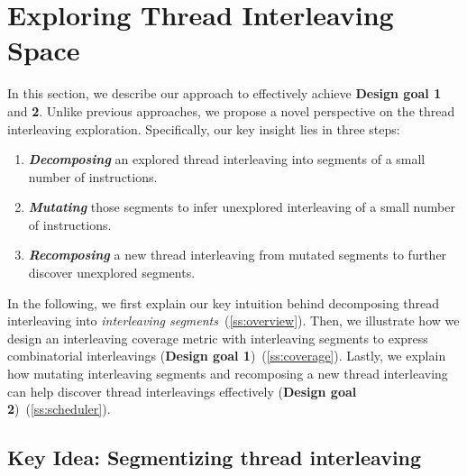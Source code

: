 \section{Exploring Thread Interleaving Space}
\label{s:design}

\newcommand{\intcov}{interleaving segment coverage\xspace}
\newcommand{\Intcov}{Interleaving segment coverage\xspace}


In this section, we describe our approach to effectively achieve
\textbf{Design goal 1} and \textbf{2}.
%
Unlike previous approaches, we propose a novel perspective on the
thread interleaving exploration.
%
Specifically, our key insight lies in three steps:

\begin{enumerate}[labelsep=0pt, label=\textbf{\arabic*) }]
\item \textbf{\textit{Decomposing}} an explored thread interleaving
  into segments of a small number of instructions.
\item \textbf{\textit{Mutating}} those segments to infer unexplored
  interleaving of a small number of instructions.
\item \textbf{\textit{Recomposing}} a new thread interleaving from
  mutated segments to further discover unexplored segments.
\end{enumerate}







In the following, we first explain our key intuition behind
decomposing thread interleaving into \textit{interleaving
  segments}~(\autoref{ss:overview}).
%
Then, we illustrate how we design an interleaving coverage metric with
interleaving segments to express combinatorial interleavings
(\textbf{Design goal 1})~(\autoref{ss:coverage}).
%
Lastly, we explain how mutating interleaving segments and recomposing
a new thread interleaving can help discover thread interleavings
effectively (\textbf{Design goal 2})~(\autoref{ss:scheduler}).



\subsection{Key Idea: Segmentizing thread interleaving}
\label{ss:overview}


